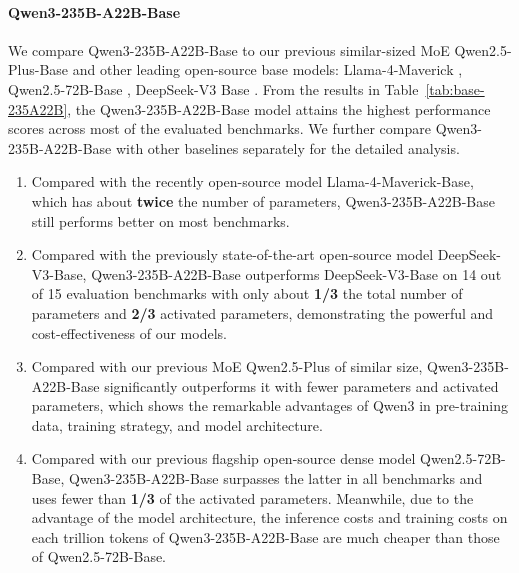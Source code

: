 \paragraph{Qwen3-235B-A22B-Base}
We compare Qwen3-235B-A22B-Base to our previous similar-sized MoE Qwen2.5-Plus-Base \citep{qwen2.5} and other leading open-source base models: Llama-4-Maverick \citep{llama4}, Qwen2.5-72B-Base \citep{qwen2.5}, DeepSeek-V3 Base \citep{deepseekv3}. From the results in Table~\ref{tab:base-235A22B}, the Qwen3-235B-A22B-Base model attains the highest performance scores across most of the evaluated benchmarks. We further compare Qwen3-235B-A22B-Base with other baselines separately for the detailed analysis.
\begin{enumerate}[label=(\arabic*)]
    \item  Compared with the recently open-source model Llama-4-Maverick-Base, which has about \textbf{twice} the number of parameters, Qwen3-235B-A22B-Base still performs better on most benchmarks.
    \item  Compared with the previously state-of-the-art open-source model DeepSeek-V3-Base, Qwen3-235B-A22B-Base outperforms DeepSeek-V3-Base on 14 out of 15 evaluation benchmarks with only about \textbf{1/3} the total number of parameters and \textbf{2/3} activated parameters, demonstrating the powerful and cost-effectiveness of our models. 
    \item  Compared with our previous MoE Qwen2.5-Plus of similar size, Qwen3-235B-A22B-Base significantly outperforms it with fewer parameters and activated parameters, which shows the remarkable advantages of Qwen3 in pre-training data, training strategy, and model architecture.
    \item  Compared with our previous flagship open-source dense model Qwen2.5-72B-Base, Qwen3-235B-A22B-Base surpasses the latter in all benchmarks and uses fewer than \textbf{1/3} of the activated parameters. Meanwhile, due to the advantage of the model architecture, the inference costs and training costs on each trillion tokens of Qwen3-235B-A22B-Base are much cheaper than those of Qwen2.5-72B-Base.
\end{enumerate}


